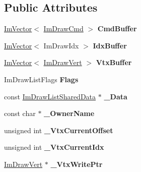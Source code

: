 \subsection*{Public Attributes}
\begin{DoxyCompactItemize}
\item 
\mbox{\label{structImDrawList_a67a4b5cc4c83bc3b81d96c46cbd38a07}} 
\hyperlink{structImVector}{Im\+Vector}$<$ \hyperlink{structImDrawCmd}{Im\+Draw\+Cmd} $>$ {\bfseries Cmd\+Buffer}
\item 
\mbox{\label{structImDrawList_adf292ff70a954d82daf061c609e75dfc}} 
\hyperlink{structImVector}{Im\+Vector}$<$ Im\+Draw\+Idx $>$ {\bfseries Idx\+Buffer}
\item 
\mbox{\label{structImDrawList_aa8ff4aee39cf3c3791b7e29a7b4264be}} 
\hyperlink{structImVector}{Im\+Vector}$<$ \hyperlink{structImDrawVert}{Im\+Draw\+Vert} $>$ {\bfseries Vtx\+Buffer}
\item 
\mbox{\label{structImDrawList_ada2c004661663ef875f4d4c7ec0b4557}} 
Im\+Draw\+List\+Flags {\bfseries Flags}
\item 
\mbox{\label{structImDrawList_a606bbd354211fe6f84cc11ebe53e7903}} 
const \hyperlink{structImDrawListSharedData}{Im\+Draw\+List\+Shared\+Data} $\ast$ {\bfseries \+\_\+\+Data}
\item 
\mbox{\label{structImDrawList_a643f385fb9d5fc35a431e72a10a212f5}} 
const char $\ast$ {\bfseries \+\_\+\+Owner\+Name}
\item 
\mbox{\label{structImDrawList_ac151456d4f253ac71d257db77d4a50e7}} 
unsigned int {\bfseries \+\_\+\+Vtx\+Current\+Offset}
\item 
\mbox{\label{structImDrawList_a2228793183665bc3d8612795555fe505}} 
unsigned int {\bfseries \+\_\+\+Vtx\+Current\+Idx}
\item 
\mbox{\label{structImDrawList_a67f870f5140bf1cab14b8515b7386073}} 
\hyperlink{structImDrawVert}{Im\+Draw\+Vert} $\ast$ {\bfseries \+\_\+\+Vtx\+Write\+Ptr}
\item 

\end{DoxyCompactItemize}
